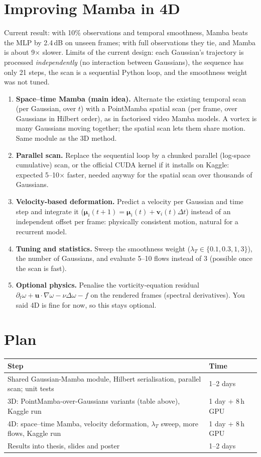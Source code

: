 \documentclass[10pt,a4paper]{article}
\newcommand{\vect}[1]{\bm{#1}}
\begin{document}
\section{Improving Mamba in 4D}
Current result: with 10\% observations and temporal smoothness, Mamba beats the MLP by 2.4\,dB on unseen frames;
with full observations they tie, and Mamba is about 9$\times$ slower. Limits of the current design: each Gaussian's
trajectory is processed \emph{independently} (no interaction between Gaussians), the sequence has only 21 steps, the
scan is a sequential Python loop, and the smoothness weight was not tuned.
\begin{enumerate}
\item \textbf{Space--time Mamba (main idea).} Alternate the existing temporal scan (per Gaussian, over $t$) with a
PointMamba spatial scan (per frame, over Gaussians in Hilbert order), as in factorised video Mamba models. A vortex
is many Gaussians moving together; the spatial scan lets them share motion. Same module as the 3D method.
\item \textbf{Parallel scan.} Replace the sequential loop by a chunked parallel (log-space cumulative) scan, or the
official CUDA kernel if it installs on Kaggle: expected 5--10$\times$ faster, needed anyway for the spatial scan
over thousands of Gaussians.
\item \textbf{Velocity-based deformation.} Predict a velocity per Gaussian and time step and integrate it
($\vect\mu_i(t+1)=\vect\mu_i(t)+\vect v_i(t)\Delta t$) instead of an independent offset per frame: physically
consistent motion, natural for a recurrent model.
\item \textbf{Tuning and statistics.} Sweep the smoothness weight ($\lambda_T\in\{0.1,0.3,1,3\}$), the number of
Gaussians, and evaluate 5--10 flows instead of 3 (possible once the scan is fast).
\item \textbf{Optional physics.} Penalise the vorticity-equation residual
$\partial_t\omega+\vect u\cdot\nabla\omega-\nu\Delta\omega-f$ on the rendered frames (spectral derivatives). You said
4D is fine for now, so this stays optional.
\end{enumerate}

\section{Plan}
\begin{tabular}{ll}
\toprule
Step & Time \\
\midrule
Shared Gaussian-Mamba module, Hilbert serialisation, parallel scan; unit tests & 1--2 days \\
3D: PointMamba-over-Gaussians variants (table above), Kaggle run & 1 day + 8\,h GPU \\
4D: space--time Mamba, velocity deformation, $\lambda_T$ sweep, more flows, Kaggle run & 1 day + 8\,h GPU \\
Results into thesis, slides and poster & 1--2 days \\
\bottomrule
\end{tabular}
\end{document}
